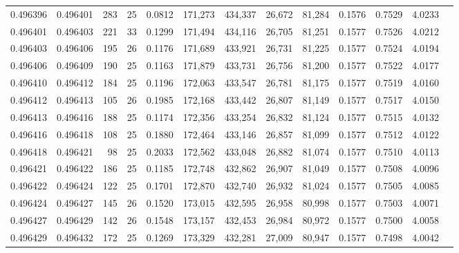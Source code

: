 \begin{tabular}{rrrrrrrrrrrrr}
0.496396 & 0.496401 & 283 &  25 &                                     0.0812 & 171,273 & 434,337 &  26,672 &  81,284 & 0.1576 & 0.7529 & 4.0233 \\
0.496401 & 0.496403 & 221 &  33 &                                     0.1299 & 171,494 & 434,116 &  26,705 &  81,251 & 0.1577 & 0.7526 & 4.0212 \\
0.496403 & 0.496406 & 195 &  26 &                                     0.1176 & 171,689 & 433,921 &  26,731 &  81,225 & 0.1577 & 0.7524 & 4.0194 \\
0.496406 & 0.496409 & 190 &  25 &                                     0.1163 & 171,879 & 433,731 &  26,756 &  81,200 & 0.1577 & 0.7522 & 4.0177 \\
0.496410 & 0.496412 & 184 &  25 &                                     0.1196 & 172,063 & 433,547 &  26,781 &  81,175 & 0.1577 & 0.7519 & 4.0160 \\
0.496412 & 0.496413 & 105 &  26 &                                     0.1985 & 172,168 & 433,442 &  26,807 &  81,149 & 0.1577 & 0.7517 & 4.0150 \\
0.496413 & 0.496416 & 188 &  25 &                                     0.1174 & 172,356 & 433,254 &  26,832 &  81,124 & 0.1577 & 0.7515 & 4.0132 \\
0.496416 & 0.496418 & 108 &  25 &                                     0.1880 & 172,464 & 433,146 &  26,857 &  81,099 & 0.1577 & 0.7512 & 4.0122 \\
0.496418 & 0.496421 &  98 &  25 &                                     0.2033 & 172,562 & 433,048 &  26,882 &  81,074 & 0.1577 & 0.7510 & 4.0113 \\
0.496421 & 0.496422 & 186 &  25 &                                     0.1185 & 172,748 & 432,862 &  26,907 &  81,049 & 0.1577 & 0.7508 & 4.0096 \\
0.496422 & 0.496424 & 122 &  25 &                                     0.1701 & 172,870 & 432,740 &  26,932 &  81,024 & 0.1577 & 0.7505 & 4.0085 \\
0.496424 & 0.496427 & 145 &  26 &                                     0.1520 & 173,015 & 432,595 &  26,958 &  80,998 & 0.1577 & 0.7503 & 4.0071 \\
0.496427 & 0.496429 & 142 &  26 &                                     0.1548 & 173,157 & 432,453 &  26,984 &  80,972 & 0.1577 & 0.7500 & 4.0058 \\
0.496429 & 0.496432 & 172 &  25 &                                     0.1269 & 173,329 & 432,281 &  27,009 &  80,947 & 0.1577 & 0.7498 & 4.0042 \\

\end{tabular}
